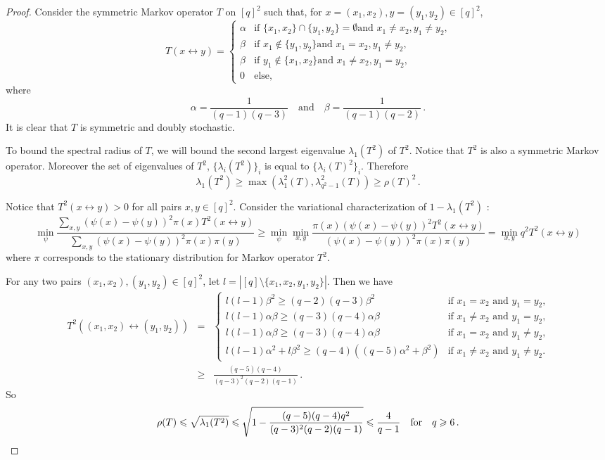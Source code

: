 \documentclass[10pt]{article}
\theoremstyle{definition}
\numberwithin{equation}{section}
\newcommand{\xiffy}[2]{\ensuremath{{#1} \mathcal{\leftrightarrow} {#2}}}
\renewcommand{\ge}{\geqslant}
\renewcommand{\le}{\leqslant}
\begin{document}
\begin{proof}
  Consider the symmetric Markov operator $T$ on $[q]^2$ such that, for
  $x=(x_1,x_2), y=(y_1,y_2)\in [q]^2$,
  \[T(\xiffy{x}{y}) =
  \begin{cases}
    \alpha &\mbox{if $\{x_1,x_2\}\cap\{y_1,y_2\}=\emptyset$
      and $x_1\neq x_2, y_1\neq y_2$,}\\
    \beta &\mbox{if $x_1\not\in\{y_1,y_2\}$
      and $x_1= x_2, y_1\neq y_2$,}\\
    \beta &\mbox{if $y_1\not\in\{x_1,x_2\}$
      and $x_1\neq x_2, y_1= y_2$,}\\
    0 & \mbox{else,}
  \end{cases}\] where \[\alpha = \frac{1}{(q-1)(q-3)}\quad \text{and}\quad \beta =
  \frac{1}{(q-1)(q-2)}\,.\] It is clear that $T$ is symmetric and doubly
  stochastic.

  To bound the spectral radius of $T$, we will bound the second
  largest eigenvalue $\lambda_1(T^2)$ of $T^2$. Notice that $T^2$ is
  also a symmetric Markov operator. Moreover the set of eigenvalues of
  $T^2$, $\{\lambda_i(T^2)\}_i$ is equal to $\{{\lambda_i(T)}^2\}_i$.
  Therefore \[\lambda_1(T^2) \ge
  \max(\lambda^2_1(T),\lambda^2_{q^2-1}(T)) \ge \rho(T)^2\,.\]

  Notice that $T^2(\xiffy{x}{y})>0$ for all pairs $x,y\in[q]^2$.
  Consider the variational characterization of $1 - \lambda_1(T^2)$
  \cite{Sinclair92}:
  \[\min_\psi \frac{\sum_{x,y}
    (\psi(x) - \psi(y))^2 \pi(x) T^2(\xiffy{x}{y})}{\sum_{x,y}
    (\psi(x)-\psi(y))^2 \pi(x)\pi(y)} \ge \min_\psi \min_{x,y}
  \frac{\pi(x) (\psi(x) - \psi(y))^2
    T^2(\xiffy{x}{y})}{(\psi(x)-\psi(y))^2 \pi(x)\pi(y)} = \min_{x,y}
  q^2 T^2(\xiffy{x}{y})\] where $\pi$ corresponds to the stationary
  distribution for Markov operator $T^2$.


  For any two pairs $(x_1,x_2),(y_1,y_2)\in[q]^2$, let $l =
  |[q]\setminus \{x_1,x_2,y_1,y_2\}|$. Then we have
  \begin{eqnarray*}
    T^2(\xiffy{(x_1,x_2)}{(y_1,y_2)}) &=& 
    \begin{cases} l (l-1)\beta^2\ge (q-2)(q-3)\beta^2 & 
      \mbox{if $x_1=x_2$ and $y_1=y_2$,}\\
      l (l-1) \alpha \beta\ge (q-3)(q-4)\alpha\beta & 
      \mbox{if $x_1\neq x_2$ and $y_1=y_2$,}\\
      l (l-1) \alpha \beta\ge (q-3)(q-4)\alpha\beta & 
      \mbox{if $x_1=x_2$ and $y_1\neq y_2$,}\\
      l (l-1) \alpha^2 + l \beta^2 \ge (q-4)((q-5)\alpha^2 + \beta^2) &
      \mbox{if $x_1\neq x_2$ and $y_1\neq y_2$.}
  \end{cases}\\
  &\ge& \frac{(q-5) (q-4)}{(q-3)^2 (q-2) (q-1)}\,.
  \end{eqnarray*}
  So \[\rho(T)\le \sqrt{\lambda_1(T^2)} \le \sqrt{1-\frac{(q-5) (q-4)
      q^2}{(q-3)^2 (q-2) (q-1)}} \le 
%
\frac{4}{q-1}\quad \text{for} \quad q\ge 6\,.\qedhere\]
\end{proof}
%
\end{document}
